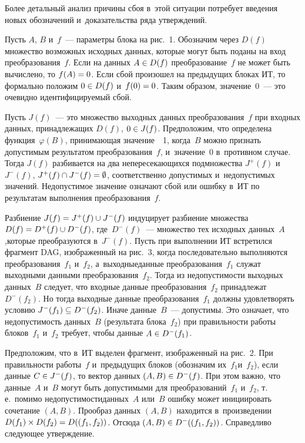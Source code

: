 \begin{multicols}{2}
  Более детальный анализ причины сбоя в~этой ситуации потребует введения 
новых обозначений и~доказательства ряда утверждений.
  
  Пусть $A$, $B$ и~$f$~--- параметры блока на рис.~1. Обозначим через $D(f)$ 
множество возможных исходных данных, которые могут быть поданы на вход 
преобразования~$f$. Если на данных $A\hm\in D(f)$ преобразование~$f$ не 
может быть вычислено, то $f(A)\hm=0$. Если сбой произошел на предыдущих 
блоках ИТ, то формально положим $0\hm\in D(f)$ и~$f(0)\hm=0$. Таким образом, 
значение~0~--- это очевидно идентифицируемый сбой. 
  
  Пусть $J(f)$~--- это множество выходных данных преобразования~$f$ при 
входных данных, принадлежащих $D(f)$, $0\hm\in J(f)$. Предположим, что 
определена функция~$\varphi(B)$, принимающая значение~~1, когда~$B$ можно 
признать допустимым результатом преобразования~$f$, и~значение~0 
в~противном случае. Тогда $J(f)$ разбивается на два непересекающихся 
подмножества $J^+(f)$ и~$J^-(f)$, $J^+(f)\cap J^-(f)\hm= \emptyset$, 
соответственно допустимых и~недопустимых значений. Недопустимое значение 
означают сбой или ошибку в~ИТ по результатам выполнения преобразования~$f$. 
  
  Разбиение $J(f)\hm= J^+(f)\cup J^-(f)$ индуцирует разбиение множества 
$D(f)\hm= D^+(f)\cup D^-(f)$, где~$D^-(f)$~--- множество тех исходных 
данных~$A$,\linebreak которые преобразуются в~$J^-(f)$. Пусть при выполнении ИТ 
встретился фрагмент DAG, изображенный на рис.~3, когда последовательно 
выполняются преобразования~$f_1$ и~$f_2$, а~выходные\linebreak данные 
преобразования~$f_1$ служат выходными данными преобразования~$f_2$. Тогда 
из недопустимости выходных данных~$B$ следует, что входные данные 
преобразования~$f_2$ принадлежат $D^-(f_2)$. Но тогда выходные данные 
преобразования~$f_1$ должны удовлетворять условию $J^-(f_1)\hm\subseteq D^-
(f_2)$. Иначе данные~$B$~--- до\-пус\-ти\-мы. Это означает, что недопустимость 
данных~$B$ (результата блока~$f_2$) при правильности работы блоков~$f_1$ 
и~$f_2$ требует, чтобы данные $A\hm\in D^-(f_1)$.
  
  Предположим, что в~ИТ выделен фрагмент, изображенный на рис.~2. При 
правильности работы~$f$ и~предыдущих блоков (обозначим их~$f_1$\linebreak и~$f_2$), 
если данные $C\hm\in J^-(f)$, то вектор данных $(A,B)\hm\in D^-(f)$. При этом 
важно, что данные~$A$ и~$B$ могут быть допустимыми для 
преобразований~$f_1$ и~$f_2$, т.\,е.\ помимо недопустимости\linebreak данных~$A$ 
или~$B$ ошибку может инициировать сочетание $(A, B)$. Прообраз данных $(A, 
B)$ находится в~произведении $D(f_1)\times D(f_2)\hm= D((f_1,f_2))$. Отсюда 
$(A,B)\hm\in D^- ((f_1,f_2))$. Справедливо следующее утверждение. 
  

\end{multicols}
